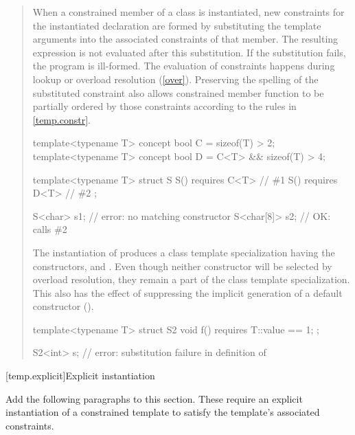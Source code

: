 \begin{quote}
\setcounter{Paras}{1}
\pnum
When a constrained member of a class is instantiated, new constraints
for the instantiated declaration are formed by substituting the
template arguments into the associated constraints of that member.
The resulting expression is not evaluated after this substitution.
% 
If the substitution fails, the program is ill-formed.
% 
\enternote
The evaluation of constraints happens during lookup or overload
resolution (\ref{over}). Preserving the spelling
of the substituted constraint also allows constrained member function
to be partially ordered by those constraints according to the rules
in \ref{temp.constr}.
\exitnote
% 
\enterexample
\begin{codeblock}
template<typename T> concept bool C = sizeof(T) > 2;
template<typename T> concept bool D = C<T> && sizeof(T) > 4;

template<typename T> struct S {
  S() requires C<T> { } // \#1
  S() requires D<T> { } // \#2
};

S<char> s1;    // error: no matching constructor
S<char[8]> s2; // OK: calls \#2
\end{codeblock}
The instantiation of  produces a class
template specialization having the constructors, 
 and
.
% 
Even though neither constructor will be selected by overload resolution,
they remain a part of the class template specialization. This also
has the effect of suppressing the implicit generation of a default 
constructor ().
% 
\begin{codeblock}
template<typename T> struct S2 {
    void f() requires T::value == 1;
  };

S2<int> s; // error: substitution failure in definition of 
\end{codeblock}
\exitexample
\end{quote}    


[temp.explicit]{Explicit instantiation}

Add the following paragraphs to this section. These require an explicit
instantiation of a constrained template to satisfy the template's
associated constraints.

